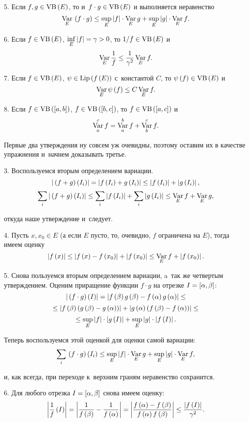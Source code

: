 \documentclass[draft]{article}
\begin{document}
\smallskip
\smallskip

5. Если $f,g\isvb\at(E)$, то и~$f \cdot g\isvb\at(E)$ и
выполняется неравенство
$$\var_E\,\at(f \cdot g)\le\sup_E\abs{f}\cdot\var_Eg+
\sup_E\abs{g}\cdot\var_Ef.$$

6. Если $f\isvb\at(E)$, $\inf\limits_E\left|f\right|=\gamma>0$, то
${1/f} \isvb\at(E)$ и
$$\mathop{\mathrm{Var}}\limits_E{1\over f}\le{1\over\gamma^2}\mathop{\mathrm{Var}}\limits_Ef.$$

7. Если $f\isvb\at(E)$, $\psi\islip\at({f\at(E)})$ с~константой $C$,
то $\psi\at(f)\isvb\at(E)$ и~$$\var_E\psi\at(f)\le C\var_Ef.$$

8. Если $f\isvb\at(\seg[a,b])$, $f\isvb\at(\seg[b,c])$, то
$f\isvb\at(\seg[a,c])$ и~$$\mathop{\mathrm{Var}}\limits_a^cf=\mathop{\mathrm{Var}}\limits_a^bf+\mathop{\mathrm{Var}}\limits_b^cf.$$

\prs

\smallskip

Первые два утверждения ну совсем уж очевидны, поэтому оставим их в
качестве упражнения и~начнем доказывать третье.

\smallskip

3. Воспользуемся вторым определением вариации.
$$\abs{\,\at(f+g)\at(I_i)}=\abs{f\at(I_i)+g\at(I_i)}\le\abs{f\at(I_i)}+\abs{g\at(I_i)},$$
$$\sumi\abs{\,\at(f+g)\at(I_i)}\le\sumi\abs{f\at(I_i)}+\sumi\abs{g\at(I_i)}\le\var_Ef+\var_Eg,$$

откуда наше утверждение и~следует.

\smallskip

4. Пусть $x,x_0 \in E$ (а если $E$ пусто, то, очевидно, $f$
ограничена на $E$), тогда имеем оценку
$$\abs{f\atx}\le\abs{f\atx-f\at(x_0)}+\abs{f\at(x_0)}\le\var_Ef+\abs{f\at(x_0)}.$$


5. Снова пользуемся вторым определением вариации, a~так же четвертым
утверждением. Оценим приращение функции $f \cdot g$ на отрезке
$I=\seg[\alpha,\beta]$:
$$\abs{\,\at(f \cdot g)\at(I)}
=\abs{f\at(\beta)g\at(\beta)-f\at(\alpha)g\at(\alpha)}\le$$
$$\le\abs{f\at(\beta)\at({g\at(\beta)-g\at(\alpha)})}+
\abs{g\at(\alpha)\at({f\at(\beta)-f\at(\alpha)})}\le$$
$$\le\sup_E\abs{f}\cdot\abs{g\at(I)}+
\sup_E\abs{g}\cdot\abs{f\at(I)}.$$

Теперь воспользуемся этой оценкой для оценки самой вариации:
$$\sumi\,\at(f \cdot g)\at(I_i)\le\sup_E\abs{f}\cdot\var_Eg+\sup_E\abs{g}\cdot\var_Ef,$$

и, как всегда, при переходе к~верхним граням неравенство сохранится.

\smallskip

6. Для любого отрезка $I=\seg[\alpha,\beta]$ снова имеем оценку:
$$\abs{{1\over f}\at(I)}=\abs{{1\over f\at(\beta)}-
{1\over f\at(\alpha)}}=\abs{f\at(\alpha)- f\at(\beta)\over
f\at(\alpha)f\at(\beta)}\le{\abs{f\at(I)}\over\gamma^2}.$$
\end{document}
